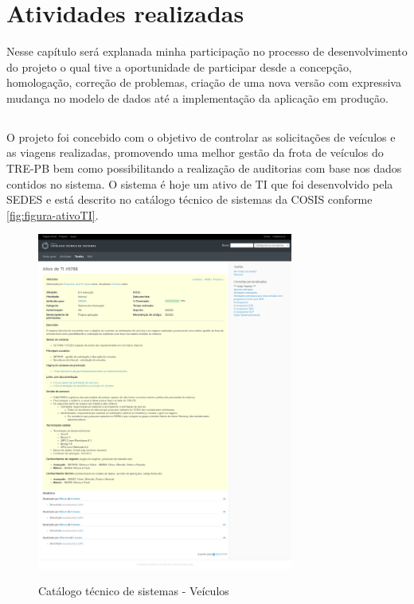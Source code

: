 
\chapter{Atividades realizadas}
\label{chap:atividadesRealizadas}

Nesse capítulo será explanada minha participação no processo de desenvolvimento do projeto o qual tive a oportunidade de participar desde a concepção, homologação, correção de problemas, criação de uma nova versão com expressiva mudança no modelo de dados até a implementação da aplicação em produção.

\section{\imprimirtitulo}
\label{sec:atividadesRealizadasVeiculos}

O projeto \imprimirtitulo \space foi concebido com o objetivo de controlar as solicitações de veículos e as viagens realizadas, promovendo uma melhor gestão da frota de veículos do TRE-PB bem como possibilitando a realização de auditorias com base nos dados contidos no sistema.
O sistema é hoje um ativo de TI que foi desenvolvido pela SEDES e está descrito no catálogo técnico de sistemas da COSIS conforme \autoref{fig:figura-ativoTI}. 

\begin{figure}[!htb]
    \centering
    \caption{Catálogo técnico de sistemas - Veículos}
    \includegraphics[width=0.75\textwidth]{./dados/figuras/veiculos-ativoTI}
    \label{fig:figura-ativoTI}
\end{figure}

